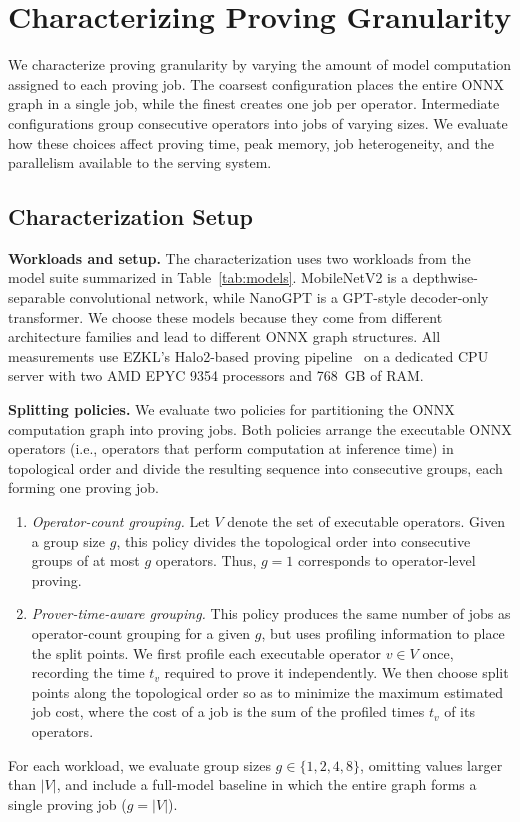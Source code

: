  

\section{Characterizing Proving Granularity}
\label{sec:proof-splitting}
We characterize proving granularity by varying the amount of model computation assigned to each proving job. The coarsest configuration places the entire ONNX graph in a single job, while the finest creates one job per operator. Intermediate configurations group consecutive operators into jobs of varying sizes. We evaluate how these choices affect proving time, peak memory, job heterogeneity, and the parallelism available to the serving system.

\subsection{Characterization Setup}

\noindent\textbf{Workloads and setup.}
The characterization uses two workloads from the model suite summarized in Table~\ref{tab:models}. MobileNetV2 is a depthwise-separable convolutional network, while NanoGPT is a GPT-style decoder-only transformer. We choose these models because they come from different architecture families and lead to different ONNX graph structures. All measurements use EZKL's Halo2-based proving pipeline~\cite{ezkl} on a dedicated CPU server with two AMD EPYC 9354 processors and 768~GB of RAM.

\noindent\textbf{Splitting policies.}
We evaluate two policies for partitioning the ONNX computation graph into
proving jobs. Both policies arrange the executable ONNX operators (i.e.,
operators that perform computation at inference time) in topological order
and divide the resulting sequence into consecutive groups, each forming one
proving job. 
\begin{enumerate}
    \item \textit{Operator-count grouping.}
    Let \(V\) denote the set of executable operators. Given a group size
    \(g\), this policy divides the topological order into consecutive groups
    of at most \(g\) operators. Thus, \(g=1\) corresponds to operator-level
    proving.
    \item \textit{Prover-time-aware grouping.}
    This policy produces the same number of jobs as operator-count grouping
    for a given \(g\), but uses profiling information to place the split
    points. We first profile each executable operator \(v \in V\) once,
    recording the time \(t_v\) required to prove it independently. We then
    choose split points along the topological order so as to minimize the
    maximum estimated job cost, where the cost of a job is the sum of the
    profiled times \(t_v\) of its operators.
\end{enumerate}
For each workload, we evaluate group sizes \(g \in \{1,2,4,8\}\), omitting
values larger than \(|V|\), and include a full-model baseline in which the
entire graph forms a single proving job (\(g = |V|\)).



